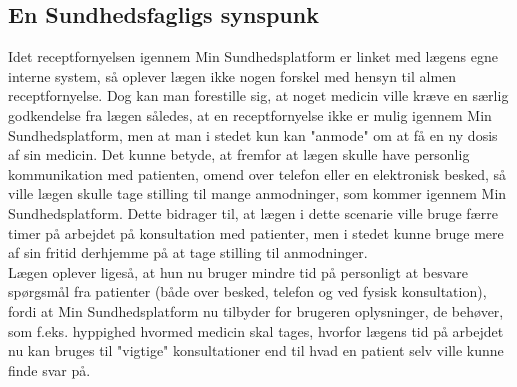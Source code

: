 \subsection{En Sundhedsfagligs synspunk}
Idet receptfornyelsen igennem Min Sundhedsplatform er linket med lægens egne interne system, så oplever lægen ikke nogen forskel med hensyn til almen receptfornyelse. Dog kan man forestille sig, at noget medicin ville kræve en særlig godkendelse fra lægen således, at en receptfornyelse ikke er mulig igennem Min Sundhedsplatform, men at man i stedet kun kan "anmode" om at få en ny dosis af sin medicin. Det kunne betyde, at fremfor at lægen skulle have personlig kommunikation med patienten, omend over telefon eller en elektronisk besked, så ville lægen skulle tage stilling til mange anmodninger, som kommer igennem Min Sundhedsplatform. Dette bidrager til, at lægen i dette scenarie ville bruge færre timer på arbejdet på konsultation med patienter, men i stedet kunne bruge mere af sin fritid derhjemme på at tage stilling til anmodninger. \\
Lægen oplever ligeså, at hun nu bruger mindre tid på personligt at besvare spørgsmål fra patienter (både over besked, telefon og ved fysisk konsultation), fordi at Min Sundhedsplatform nu tilbyder for brugeren oplysninger, de behøver, som f.eks. hyppighed hvormed medicin skal tages, hvorfor lægens tid på arbejdet nu kan bruges til "vigtige" konsultationer end til hvad en patient selv ville kunne finde svar på. 
